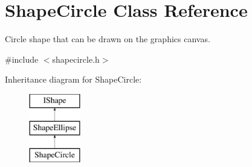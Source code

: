 \hypertarget{class_shape_circle}{}\section{Shape\+Circle Class Reference}
\label{class_shape_circle}


Circle shape that can be drawn on the graphics canvas.  




{\ttfamily \#include $<$shapecircle.\+h$>$}

Inheritance diagram for Shape\+Circle\+:\begin{figure}[H]
\begin{center}
\leavevmode
\includegraphics[height=3.000000cm]{class_shape_circle}
\end{center}
\end{figure}

